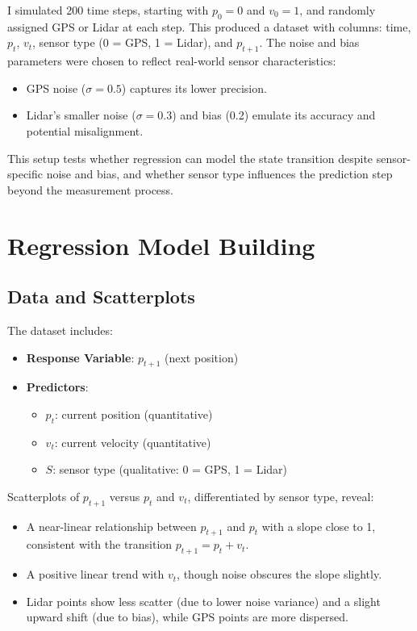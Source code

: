 \documentclass[12pt]{article}
\begin{document}
I simulated 200 time steps, starting with \( p_0 = 0 \) and \( v_0 = 1 \), and randomly assigned GPS or Lidar at each step. This produced a dataset with columns: time, \( p_t \), \( v_t \), sensor type (0 = GPS, 1 = Lidar), and \( p_{t+1} \). The noise and bias parameters were chosen to reflect real-world sensor characteristics:
\begin{itemize}
    \item GPS noise (\( \sigma = 0.5 \)) captures its lower precision.
    \item Lidar’s smaller noise (\( \sigma = 0.3 \)) and bias (0.2) emulate its accuracy and potential misalignment.
\end{itemize}

This setup tests whether regression can model the state transition despite sensor-specific noise and bias, and whether sensor type influences the prediction step beyond the measurement process.

\section{Regression Model Building}
\label{sec:regression}

\subsection{Data and Scatterplots}
\label{subsec:data}

The dataset includes:
\begin{itemize}
    \item \textbf{Response Variable}: \( p_{t+1} \) (next position)
    \item \textbf{Predictors}:
    \begin{itemize}
        \item \( p_t \): current position (quantitative)
        \item \( v_t \): current velocity (quantitative)
        \item \( S \): sensor type (qualitative: 0 = GPS, 1 = Lidar)
    \end{itemize}
\end{itemize}

Scatterplots of \( p_{t+1} \) versus \( p_t \) and \( v_t \), differentiated by sensor type, reveal:
\begin{itemize}
    \item A near-linear relationship between \( p_{t+1} \) and \( p_t \) with a slope close to 1, consistent with the transition \( p_{t+1} = p_t + v_t \).
    \item A positive linear trend with \( v_t \), though noise obscures the slope slightly.
    \item Lidar points show less scatter (due to lower noise variance) and a slight upward shift (due to bias), while GPS points are more dispersed.
\end{itemize}
\end{document}
